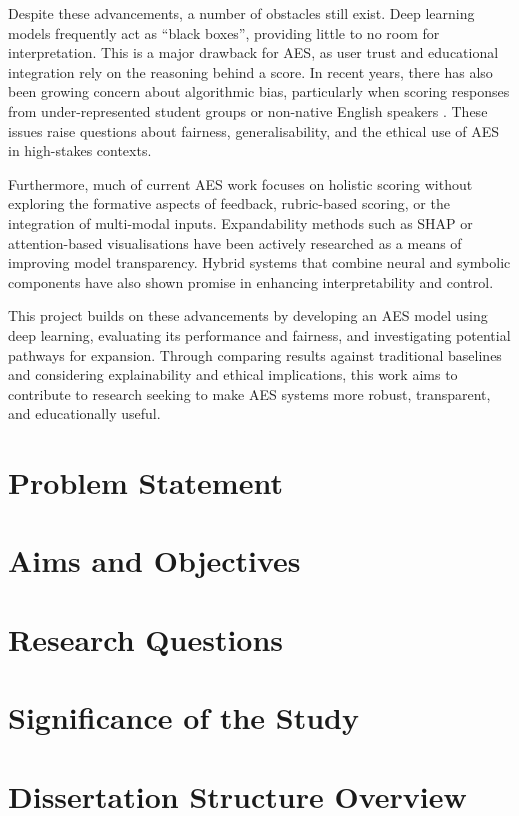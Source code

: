 \documentclass[12pt]{report}
\begin{document}
Despite these advancements, a number of obstacles still exist. Deep learning models frequently act as ``black boxes'', providing little to no room for interpretation. This is a major drawback for 
AES, as user trust and educational integration rely on the reasoning behind a score. In recent years, there has also been growing concern about algorithmic bias, particularly when scoring responses 
from under-represented student groups or non-native English speakers \parencite{blodgett2020language}. These issues raise questions about fairness, generalisability, and the ethical use of AES in 
high-stakes contexts.

Furthermore, much of current AES work focuses on holistic scoring without exploring the formative aspects of feedback, rubric-based scoring, or the integration of multi-modal inputs. Expandability 
methods such as SHAP \parencite{lundberg2017unified} or attention-based visualisations have been actively researched as a means of improving model transparency. Hybrid systems that combine neural 
and symbolic components have also shown promise in enhancing interpretability and control.

This project builds on these advancements by developing an AES model using deep learning, evaluating its performance and fairness, and investigating potential pathways for expansion. Through comparing 
results against traditional baselines and considering explainability and ethical implications, this work aims to contribute to research seeking to make AES systems more robust, transparent, and 
educationally useful.





\section{Problem Statement}
\section{Aims and Objectives}
\section{Research Questions}
\section{Significance of the Study}
\section{Dissertation Structure Overview}
\end{document}
